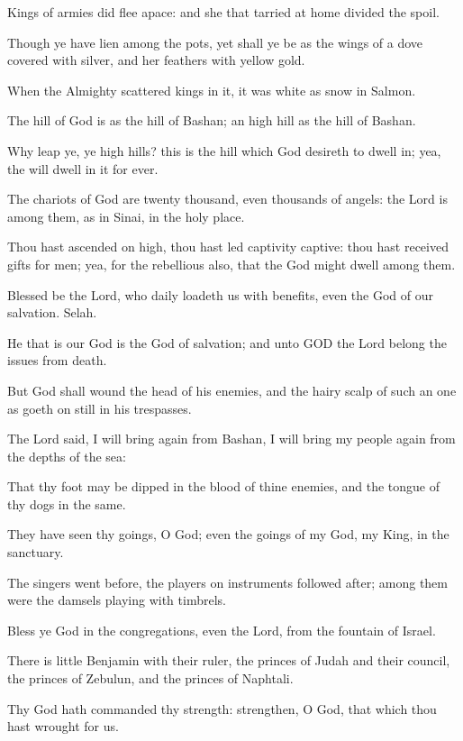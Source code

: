 \Verse Kings of armies did flee apace: and she that tarried at home divided the spoil.

\Verse Though ye have lien among the pots, yet shall ye be as the wings of a dove covered with silver, and her feathers with yellow gold.

\Verse When the Almighty scattered kings in it, it was white as snow in Salmon.

\Verse The hill of God is as the hill of Bashan; an high hill as the hill of Bashan.

\Verse Why leap ye, ye high hills? this is the hill which God desireth to dwell in; yea, the \LORD will dwell in it for ever.

\Verse The chariots of God are twenty thousand, even thousands of angels: the Lord is among them, as in Sinai, in the holy place.

\Verse Thou hast ascended on high, thou hast led captivity captive: thou hast received gifts for men; yea, for the rebellious also, that the \LORD God might dwell among them.

\Verse Blessed be the Lord, who daily loadeth us with benefits, even the God of our salvation. Selah.

\Verse He that is our God is the God of salvation; and unto GOD the Lord belong the issues from death.

\Verse But God shall wound the head of his enemies, and the hairy scalp of such an one as goeth on still in his trespasses.

\Verse The Lord said, I will bring again from Bashan, I will bring my people again from the depths of the sea:

\Verse That thy foot may be dipped in the blood of thine enemies, and the tongue of thy dogs in the same.

\Verse They have seen thy goings, O God; even the goings of my God, my King, in the sanctuary.

\Verse The singers went before, the players on instruments followed after; among them were the damsels playing with timbrels.

\Verse Bless ye God in the congregations, even the Lord, from the fountain of Israel.

\Verse There is little Benjamin with their ruler, the princes of Judah and their council, the princes of Zebulun, and the princes of Naphtali.

\Verse Thy God hath commanded thy strength: strengthen, O God, that which thou hast wrought for us.

